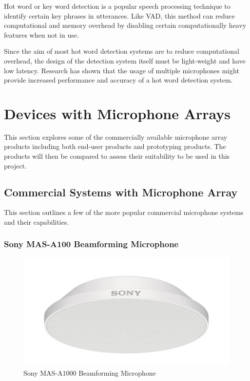 \documentclass[hidelinks,12pt]{report} %
\begin{document}
Hot word or key word detection is a popular speech processing technique to identify certain key phrases in utterances. Like VAD, this method can reduce computational and memory overhead by disabling certain computationally heavy features when not in use. 

Since the aim of most hot word detection systems are to reduce computational overhead, the design of the detection system itself must be light-weight and have low latency. Research has shown that the usage of multiple microphones might provide increased performance and accuracy of a hot word detection system\cite{18}.

\section{Devices with Microphone Arrays}

This section explores some of the commercially available microphone array products including both end-user products and prototyping products. The products will then be compared to assess their suitability to be used in this project. 

\subsection{Commercial Systems with Microphone Array}

This section outlines a few of the more popular commercial microphone systems and their capabilities.

\subsubsection{Sony MAS-A100 Beamforming Microphone}

\begin{figure}[h]
\centering
\includegraphics[scale = 1.0]{fig2.3} 
\caption{Sony MAS-A1000 Beamforming Microphone}
\label{fig}
\end{figure}
\end{document}
